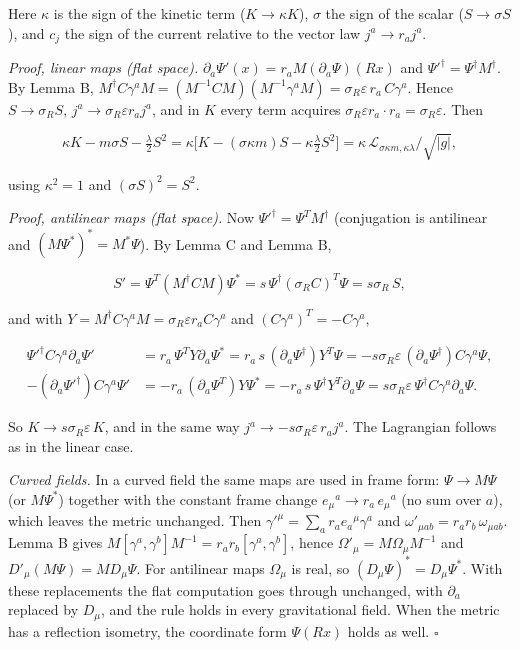 \documentclass[11pt]{article}
\begin{document}
Here $\kappa$ is the sign of the kinetic term ($K\to\kappa K$), $\sigma$ the sign of the scalar ($S\to\sigma S$), and $c_j$ the sign of the current relative to the vector law $j^a\to r_aj^a$.

\emph{Proof, linear maps (flat space).} $\partial_a\Psi'(x)=r_aM(\partial_a\Psi)(Rx)$ and $\Psi'^\dagger=\Psi^\dagger M^\dagger$. By Lemma B, $M^\dagger C\gamma^aM=(M^{-1}CM)(M^{-1}\gamma^aM)=\sigma_R\varepsilon\,r_a\,C\gamma^a$. Hence $S\to\sigma_RS$, $j^a\to\sigma_R\varepsilon r_aj^a$, and in $K$ every term acquires $\sigma_R\varepsilon r_a\cdot r_a=\sigma_R\varepsilon$. Then

\[
\kappa K-m\sigma S-\tfrac\lambda2S^2=\kappa\bigl[K-(\sigma\kappa m)S-\kappa\tfrac\lambda2S^2\bigr]=\kappa\,\mathcal L_{\sigma\kappa m,\kappa\lambda}/\sqrt{|g|},
\]

using $\kappa^2=1$ and $(\sigma S)^2=S^2$.

\emph{Proof, antilinear maps (flat space).} Now $\Psi'^\dagger=\Psi^TM^\dagger$ (conjugation is antilinear and $(M\Psi^\ast)^\ast=M^\ast\Psi$). By Lemma C and Lemma B,

\[
S'=\Psi^T(M^\dagger CM)\Psi^\ast=s\,\Psi^\dagger(\sigma_RC)^T\Psi=s\sigma_R\,S ,
\]

and with $Y=M^\dagger C\gamma^aM=\sigma_R\varepsilon r_aC\gamma^a$ and $(C\gamma^a)^T=-C\gamma^a$,

\[
\begin{aligned}
\Psi'^\dagger C\gamma^a\partial_a\Psi'&=r_a\,\Psi^TY\partial_a\Psi^\ast=r_a\,s\,(\partial_a\Psi^\dagger)Y^T\Psi=-s\sigma_R\varepsilon\,(\partial_a\Psi^\dagger)C\gamma^a\Psi,\\
-(\partial_a\Psi'^\dagger)C\gamma^a\Psi'&=-r_a\,(\partial_a\Psi^T)Y\Psi^\ast=-r_a\,s\,\Psi^\dagger Y^T\partial_a\Psi=s\sigma_R\varepsilon\,\Psi^\dagger C\gamma^a\partial_a\Psi .
\end{aligned}
\]

So $K\to s\sigma_R\varepsilon\,K$, and in the same way $j^a\to-s\sigma_R\varepsilon\,r_aj^a$. The Lagrangian follows as in the linear case.

\emph{Curved fields.} In a curved field the same maps are used in frame form: $\Psi\to M\Psi$ (or $M\Psi^\ast$) together with the constant frame change $e_\mu{}^a\to r_a\,e_\mu{}^a$ (no sum over $a$), which leaves the metric unchanged. Then $\gamma'^\mu=\sum_ar_ae_a{}^\mu\gamma^a$ and $\omega'_{\mu ab}=r_ar_b\,\omega_{\mu ab}$. Lemma B gives $M[\gamma^a,\gamma^b]M^{-1}=r_ar_b[\gamma^a,\gamma^b]$, hence $\Omega'_\mu=M\Omega_\mu M^{-1}$ and $D'_\mu(M\Psi)=MD_\mu\Psi$. For antilinear maps $\Omega_\mu$ is real, so $(D_\mu\Psi)^\ast=D_\mu\Psi^\ast$. With these replacements the flat computation goes through unchanged, with $\partial_a$ replaced by $D_\mu$, and the rule holds in every gravitational field. When the metric has a reflection isometry, the coordinate form $\Psi(Rx)$ holds as well. $\square$
\end{document}
